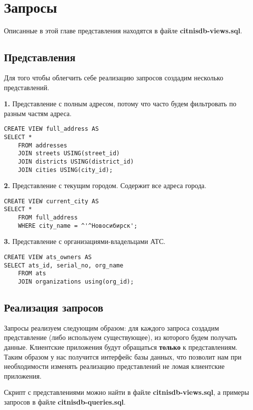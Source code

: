 \documentclass{report}
\begin{document}
\chapter{Запросы}
Описанные в этой главе представления находятся в файле 
\textbf{citnisdb-views.sql}.
\section{Представления}

Для того чтобы облегчить себе реализацию запросов создадим несколько
представлений.

\textbf{1.} Представление с полным адресом, потому что часто будем фильтровать
по разным частям адреса.

\begin{lstlisting}
CREATE VIEW full_address AS
SELECT *
    FROM addresses 
    JOIN streets USING(street_id)
    JOIN districts USING(district_id)
    JOIN cities USING(city_id);
\end{lstlisting}

\textbf{2.} Представление с текущим городом. Содержит все адреса города.

\begin{lstlisting}
CREATE VIEW current_city AS
SELECT *
    FROM full_address 
    WHERE city_name = ^'^Новосибирск';
\end{lstlisting}

\textbf{3.} Представление с организациями-владельцами АТС.

\begin{lstlisting}
CREATE VIEW ats_owners AS
SELECT ats_id, serial_no, org_name
    FROM ats 
    JOIN organizations using(org_id);
\end{lstlisting}

\section{Реализация запросов}

Запросы реализуем следующим образом: для каждого запроса
создадим представление (либо используем существующее), 
из которого будем получать данные. Клиентские приложения
будут обращаться \textbf{только} к представлениям. Таким образом у нас 
получится интерфейс базы данных, что позволит нам при необходимости 
изменять реализацию представлений не ломая клиентские 
приложения. 

Скрипт с представлениями можно найти в файле \textbf{citnisdb-views.sql},
а примеры запросов в файле \textbf{citnisdb-queries.sql}.
\end{document}
